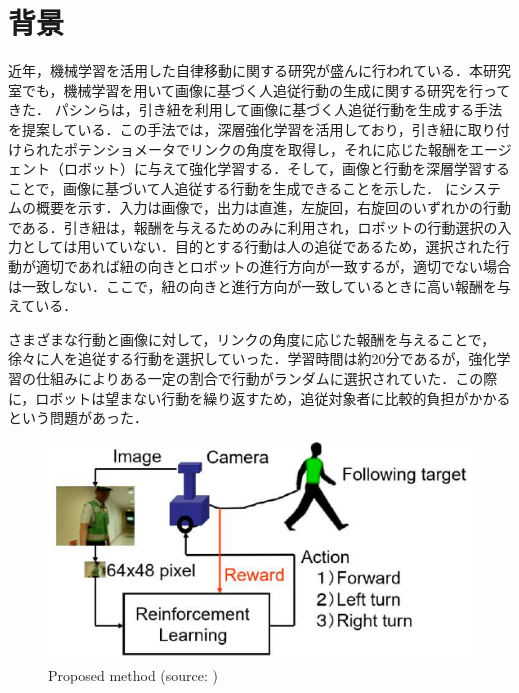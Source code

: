 
\section{背景}
  近年，機械学習を活用した自律移動に関する研究が盛んに行われている．本研究室でも，機械学習を用いて画像に基づく人追従行動の生成に関する研究を行ってきた．
  パシンら\cite{pasin1}\cite{pasin2}\cite{pasin3}は，引き紐を利用して画像に基づく人追従行動を生成する手法を提案している．この手法では，深層強化学習\cite{hado}を活用しており，引き紐に取り付けられたポテンショメータでリンクの角度を取得し，それに応じた報酬をエージェント（ロボット）に与えて強化学習\cite{leslie}する．そして，画像と行動を深層学習\cite{yann2}することで，画像に基づいて人追従する行動を生成できることを示した．
  にシステムの概要を示す．入力は画像で，出力は直進，左旋回，右旋回のいずれかの行動である．引き紐は，報酬を与えるためのみに利用され，ロボットの行動選択の入力としては用いていない．目的とする行動は人の追従であるため，選択された行動が適切であれば紐の向きとロボットの進行方向が一致するが，適切でない場合は一致しない．ここで，紐の向きと進行方向が一致しているときに高い報酬を与えている．

  さまざまな行動と画像に対して，リンクの角度に応じた報酬を与えることで，徐々に人を追従する行動を選択していった．学習時間は約20分であるが，強化学習の仕組みによりある一定の割合で行動がランダムに選択されていた．この際に，ロボットは望まない行動を繰り返すため，追従対象者に比較的負担がかかるという問題があった．

\newpage

  \begin{figure}[h]
    \centering
    \includegraphics[keepaspectratio, scale=1.25] {images/pdf/pasin_system}
    \caption[Proposed method]{Proposed method (source: \cite{pasin1})}
    \label{Fig:pasin_system}
  \end{figure}

